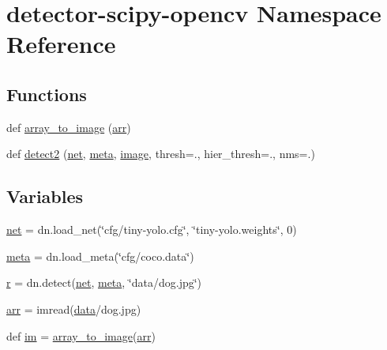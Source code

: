 \hypertarget{namespacedetector-scipy-opencv}{}\section{detector-\/scipy-\/opencv Namespace Reference}
\label{namespacedetector-scipy-opencv}
\subsection*{Functions}
\begin{DoxyCompactItemize}
\item 
def \mbox{\hyperlink{namespacedetector-scipy-opencv_a21af42bac0599affdd209fb7ad6ace05}{array\+\_\+to\+\_\+image}} (\mbox{\hyperlink{namespacedetector-scipy-opencv_a0472a36e7499b02302910f8ab212facb}{arr}})
\item 
def \mbox{\hyperlink{namespacedetector-scipy-opencv_a965d0b9c768aaaf2cede0dd9e1148b1d}{detect2}} (\mbox{\hyperlink{namespacedetector-scipy-opencv_a5e661955bb33e5ddd0c20e700ef246b1}{net}}, \mbox{\hyperlink{namespacedetector-scipy-opencv_aefa8c13d2324512c8b50817683901197}{meta}}, \mbox{\hyperlink{structimage}{image}}, thresh=., hier\+\_\+thresh=., nms=.)
\end{DoxyCompactItemize}
\subsection*{Variables}
\begin{DoxyCompactItemize}
\item 
\mbox{\hyperlink{namespacedetector-scipy-opencv_a5e661955bb33e5ddd0c20e700ef246b1}{net}} = dn.\+load\+\_\+net(\char`\"{}cfg/tiny-\/yolo.\+cfg\char`\"{}, \char`\"{}tiny-\/yolo.\+weights\char`\"{}, 0)
\item 
\mbox{\hyperlink{namespacedetector-scipy-opencv_aefa8c13d2324512c8b50817683901197}{meta}} = dn.\+load\+\_\+meta(\char`\"{}cfg/coco.\+data\char`\"{})
\item 
\mbox{\hyperlink{namespacedetector-scipy-opencv_a454d4a9590e11c36c21186a87d98a199}{r}} = dn.\+detect(\mbox{\hyperlink{namespacedetector-scipy-opencv_a5e661955bb33e5ddd0c20e700ef246b1}{net}}, \mbox{\hyperlink{namespacedetector-scipy-opencv_aefa8c13d2324512c8b50817683901197}{meta}}, \char`\"{}data/dog.\+jpg\char`\"{})
\item 
\mbox{\hyperlink{namespacedetector-scipy-opencv_a0472a36e7499b02302910f8ab212facb}{arr}} = imread(\textquotesingle{}\mbox{\hyperlink{structdata}{data}}/dog.\+jpg\textquotesingle{})
\item 
def \mbox{\hyperlink{namespacedetector-scipy-opencv_a5f732f155542b878160190ca2240d4db}{im}} = \mbox{\hyperlink{namespacedetector-scipy-opencv_a21af42bac0599affdd209fb7ad6ace05}{array\+\_\+to\+\_\+image}}(\mbox{\hyperlink{namespacedetector-scipy-opencv_a0472a36e7499b02302910f8ab212facb}{arr}})
\end{DoxyCompactItemize}


